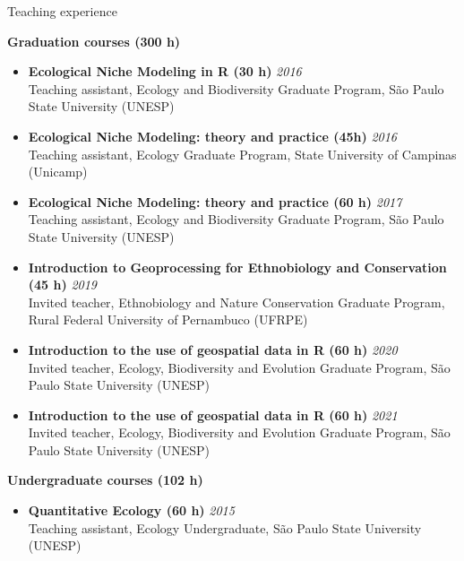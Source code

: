 \documentclass{resume}
\begin{document}

\begin{rSection}{Teaching experience}

{\bf Graduation courses (300 h)}
\begin{itemize} 
\item {\bf Ecological Niche Modeling in R (30 h)} \hfill{\em 2016}\\
Teaching assistant, Ecology and Biodiversity Graduate Program, São Paulo State University (UNESP)

\item {\bf Ecological Niche Modeling: theory and practice (45h)} \hfill{\em 2016}\\
Teaching assistant, Ecology Graduate Program, State University of Campinas (Unicamp)

\item {\bf Ecological Niche Modeling: theory and practice (60 h)} \hfill{\em 2017}\\
Teaching assistant, Ecology and Biodiversity Graduate Program, São Paulo State University (UNESP)

\item {\bf Introduction to Geoprocessing for Ethnobiology and Conservation (45 h)} \hfill{\em 2019}\\
Invited teacher, Ethnobiology and Nature Conservation Graduate Program, Rural Federal University of Pernambuco (UFRPE)

\item {\bf Introduction to the use of geospatial data in R (60 h)} \hfill{\em 2020}\\
Invited teacher, Ecology, Biodiversity and Evolution Graduate Program, São Paulo State University (UNESP)

\item {\bf Introduction to the use of geospatial data in R (60 h)} \hfill{\em 2021}\\
Invited teacher, Ecology, Biodiversity and Evolution Graduate Program, São Paulo State University (UNESP)
\end{itemize}

{\bf Undergraduate courses (102 h)}
\begin{itemize}
\item {\bf Quantitative Ecology (60 h)} \hfill{\em 2015}\\
Teaching assistant, Ecology Undergraduate, São Paulo State University (UNESP)


\end{itemize}
\end{rSection}
\end{document}
